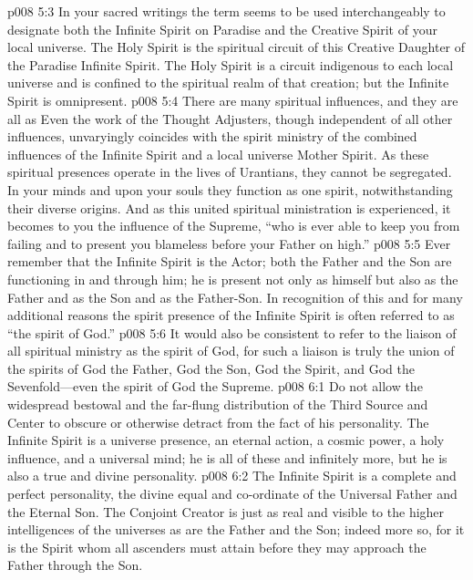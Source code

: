 \pc \vs p008 5:3 In your sacred writings the term  seems to be used interchangeably to designate both the Infinite Spirit on Paradise and the Creative Spirit of your local universe. The Holy Spirit is the spiritual circuit of this Creative Daughter of the Paradise Infinite Spirit. The Holy Spirit is a circuit indigenous to each local universe and is confined to the spiritual realm of that creation; but the Infinite Spirit is omnipresent.
\pc \vs p008 5:4 There are many spiritual influences, and they are all as  Even the work of the Thought Adjusters, though independent of all other influences, unvaryingly coincides with the spirit ministry of the combined influences of the Infinite Spirit and a local universe Mother Spirit. As these spiritual presences operate in the lives of Urantians, they cannot be segregated. In your minds and upon your souls they function as one spirit, notwithstanding their diverse origins. And as this united spiritual ministration is experienced, it becomes to you the influence of the Supreme, “who is ever able to keep you from failing and to present you blameless before your Father on high.”
\vs p008 5:5 Ever remember that the Infinite Spirit is the  Actor; both the Father and the Son are functioning in and through him; he is present not only as himself but also as the Father and as the Son and as the Father\hyp{}Son. In recognition of this and for many additional reasons the spirit presence of the Infinite Spirit is often referred to as “the spirit of God.”
\vs p008 5:6 It would also be consistent to refer to the liaison of all spiritual ministry as the spirit of God, for such a liaison is truly the union of the spirits of God the Father, God the Son, God the Spirit, and God the Sevenfold---even the spirit of God the Supreme.
\vs p008 6:1 Do not allow the widespread bestowal and the far\hyp{}flung distribution of the Third Source and Center to obscure or otherwise detract from the fact of his personality. The Infinite Spirit is a universe presence, an eternal action, a cosmic power, a holy influence, and a universal mind; he is all of these and infinitely more, but he is also a true and divine personality.
\vs p008 6:2 The Infinite Spirit is a complete and perfect personality, the divine equal and co\hyp{}ordinate of the Universal Father and the Eternal Son. The Conjoint Creator is just as real and visible to the higher intelligences of the universes as are the Father and the Son; indeed more so, for it is the Spirit whom all ascenders must attain before they may approach the Father through the Son.
